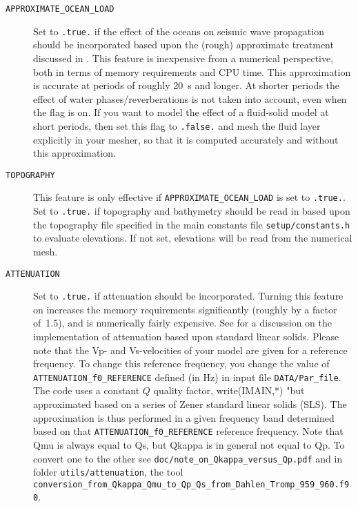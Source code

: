 \begin{description}
\item [{\texttt{APPROXIMATE\_OCEAN\_LOAD}}] Set to \texttt{.true.} if the
effect of the oceans on seismic wave propagation should be incorporated
based upon the (rough) approximate treatment discussed in \citet{KoTr02b}.
This feature is inexpensive from a numerical perspective, both in
terms of memory requirements and CPU time. This approximation is accurate
at periods of roughly 20~s and longer. At shorter periods the effect
of water phases/reverberations is not taken into account, even when
the flag is on. If you want to model the effect of a fluid-solid model
at short periods, then set this flag to \texttt{.false.} and mesh
the fluid layer explicitly in your mesher, so that it is computed
accurately and without this approximation.
\item [{\texttt{TOPOGRAPHY}}] This feature is only effective if \texttt{APPROXIMATE\_OCEAN\_LOAD}
is set to \texttt{.true.}. Set to \texttt{.true.} if topography and
bathymetry should be read in based upon the topography file specified
in the main constants file \texttt{setup/constants.h} to evaluate elevations. If not set, elevations
will be read from the numerical mesh.
\item [{\texttt{ATTENUATION}}] Set to \texttt{.true.} if attenuation should
be incorporated. Turning this feature on increases the memory requirements
significantly (roughly by a factor of~1.5), and is numerically fairly
expensive. See \citet{KoTr99,KoTr02a} for a discussion on the implementation
of attenuation based upon standard linear solids. Please note that
the Vp- and Vs-velocities of your model are given for a reference
frequency. To change this reference frequency, you change the value
of \texttt{ATTENUATION\_f0\_REFERENCE} defined (in Hz) in input file \texttt{DATA/Par\_file}.
The code uses a constant $Q$ quality factor, write(IMAIN,*) "but approximated based on a series of Zener standard linear solids (SLS).
The approximation is thus performed in a given frequency band determined based on that \texttt{ATTENUATION\_f0\_REFERENCE} reference frequency.
Note that Qmu is always equal to Qs, but Qkappa is in general not equal to Qp.
To convert one to the other see \texttt{doc/note\_on\_Qkappa\_versus\_Qp.pdf}
and in folder \texttt{utils/attenuation}, the tool
\texttt{conversion\_from\_Qkappa\_Qmu\_to\_Qp\_Qs\_from\_Dahlen\_Tromp\_959\_960.f90}.


\end{description}
